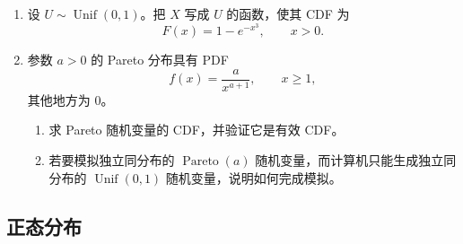 \documentclass[UTF8,12pt,a4paper,fontset=fandol]{ctexart}
\begin{document}
\begin{enumerate}
  \item 设 $U\sim\operatorname{Unif}(0,1)$。把 $X$ 写成 $U$ 的函数，使其 CDF 为
  \[
    F(x)=1-e^{-x^3},\qquad x>0.
  \]

  \item 参数 $a>0$ 的 Pareto 分布具有 PDF
  \[
    f(x)=\frac{a}{x^{a+1}},\qquad x\ge1,
  \]
  其他地方为 $0$。
  \begin{enumerate}
    \item 求 Pareto 随机变量的 CDF，并验证它是有效 CDF。
    \item 若要模拟独立同分布的 $\operatorname{Pareto}(a)$ 随机变量，而计算机只能生成独立同分布的 $\operatorname{Unif}(0,1)$ 随机变量，说明如何完成模拟。
  \end{enumerate}
\end{enumerate}

\subsection*{正态分布}
\end{document}

